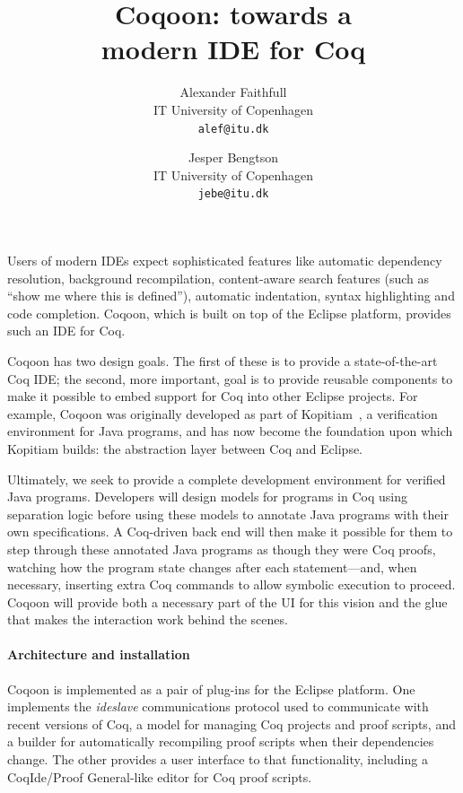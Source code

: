 \documentclass{article}
\author{
	Alexander Faithfull\\IT University of Copenhagen\\\texttt{alef@itu.dk}
	\and
	Jesper Bengtson\\IT University of Copenhagen\\\texttt{jebe@itu.dk}}
\title{Coqoon: towards a\\modern IDE for Coq}
\date{}
\begin{document}
\maketitle

\noindent
Users of modern IDEs expect sophisticated features like automatic dependency
resolution, background recompilation, content-aware search features (such as
``show me where this is defined''), automatic indentation, syntax highlighting
and code completion. Coqoon, which is built on top of the Eclipse platform,
provides such an IDE for Coq.

Coqoon has two design goals. The first of these is to provide a
state-of-the-art Coq IDE; the second, more important, goal is to provide
reusable components to make it possible to embed support for Coq into other
Eclipse projects. For example, Coqoon was originally developed as part of
Kopitiam~\cite{DBLP:conf/nfm/Mehnert11}, a verification environment for Java
programs, and has now become the foundation upon which Kopitiam builds: the
abstraction layer between Coq and Eclipse.

Ultimately, we seek to provide a complete development environment for verified
Java programs. Developers will design models for programs in Coq using
separation logic before using these models to annotate Java programs with
their own specifications. A Coq-driven back end will then make it possible for
them to step through these annotated Java programs as though they were Coq
proofs, watching how the program state changes after each statement---and, when
necessary, inserting extra Coq commands to allow symbolic execution to proceed.
Coqoon will provide both a necessary part of the UI for this vision and the
glue that makes the interaction work behind the scenes.

\paragraph{Architecture and installation}

Coqoon is implemented as a pair of plug-ins for the Eclipse platform. One
implements the \emph{ideslave} communications protocol used to communicate
with recent versions of Coq, a model for managing Coq projects and
proof scripts, and a builder for automatically recompiling proof scripts when
their dependencies change. The other provides a user interface to that
functionality, including a CoqIde/Proof General-like editor for Coq
proof scripts.

\pagebreak
\end{document}
